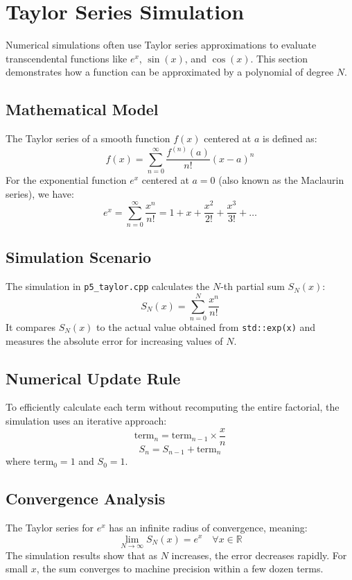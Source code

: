 \section*{Taylor Series Simulation}

Numerical simulations often use Taylor series approximations to evaluate transcendental functions like $e^x$, $\sin(x)$, and $\cos(x)$. This section demonstrates how a function can be approximated by a polynomial of degree $N$.

\subsection*{Mathematical Model}

The Taylor series of a smooth function $f(x)$ centered at $a$ is defined as:
\[
f(x) = \sum_{n=0}^{\infty} \frac{f^{(n)}(a)}{n!} (x - a)^n
\]
For the exponential function $e^x$ centered at $a = 0$ (also known as the Maclaurin series), we have:
\[
e^x = \sum_{n=0}^{\infty} \frac{x^n}{n!} = 1 + x + \frac{x^2}{2!} + \frac{x^3}{3!} + \dots
\]

\subsection*{Simulation Scenario}

The simulation in \texttt{p5\_taylor.cpp} calculates the $N$-th partial sum $S_N(x)$:
\[
S_N(x) = \sum_{n=0}^{N} \frac{x^n}{n!}
\]
It compares $S_N(x)$ to the actual value obtained from \texttt{std::exp(x)} and measures the absolute error for increasing values of $N$.

\subsection*{Numerical Update Rule}

To efficiently calculate each term without recomputing the entire factorial, the simulation uses an iterative approach:
\[
\text{term}_{n} = \text{term}_{n-1} \times \frac{x}{n}
\]
\[
S_n = S_{n-1} + \text{term}_n
\]
where $\text{term}_0 = 1$ and $S_0 = 1$.

\subsection*{Convergence Analysis}

The Taylor series for $e^x$ has an infinite radius of convergence, meaning:
\[
\lim_{N \to \infty} S_N(x) = e^x \quad \forall x \in \mathbb{R}
\]
The simulation results show that as $N$ increases, the error decreases rapidly. For small $x$, the sum converges to machine precision within a few dozen terms.

